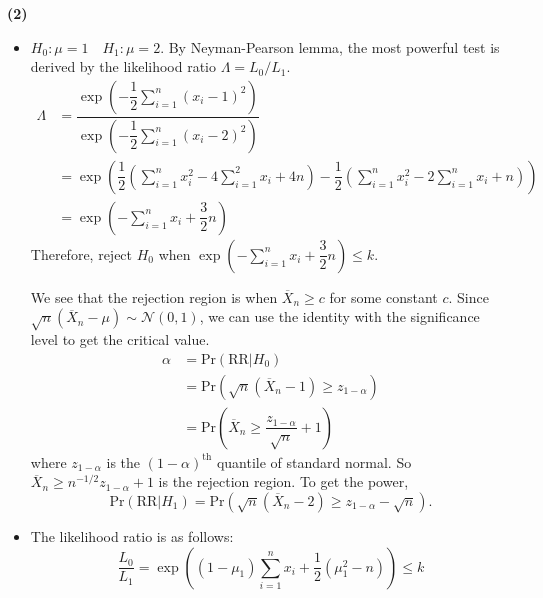 \documentclass[answers]{exam}
\begin{document}
\begin{questions}
      \begin{solution}
         \textbf{(2)}
         \begin{itemize}
            \item $H_{0}:\mu=1\quad H_{1}:\mu=2$. By Neyman-Pearson lemma, the most powerful test is derived by the likelihood ratio $\Lambda=L_{0}/L_{1}$.
            \begin{align}
              \Lambda &= \dfrac{\exp\left(-\dfrac{1}{2}\sum_{i=1}^{n}\left(x_{i}-1\right)^{2}\right)}{\exp\left(-\dfrac{1}{2}\sum_{i=1}^{n}\left(x_{i}-2\right)^{2}\right)}\\
              &= \exp\left(\dfrac{1}{2}\left(\sum_{i=1}^{n}x_{i}^{2}-4\sum_{i=1}^{2}x_{i}+4n\right)-\dfrac{1}{2}\left(\sum_{i=1}^{n}x_{i}^{2}-2\sum_{i=1}^{n}x_{i}+n\right) \right)\\
              &= \exp\left(-\sum_{i=1}^{n}x_{i}+\dfrac{3}{2}n\right)
            \end{align}
            Therefore, reject $H_{0}$ when $\exp\left(-\displaystyle\sum_{i=1}^{n}x_{i}+\dfrac{3}{2}n\right) \leq k$.\par
            We see that the rejection region is when $\overline{X}_{n}\geq c$ for some constant $c$. Since $\sqrt{n}\left(\overline{X}_{n}-\mu\right) \sim \mathcal{N}\left(0,1\right)$, we can use the identity with the significance level to get the critical value.
            \begin{align}
              \alpha &= \mathrm{Pr}\left(\mathrm{RR}|H_{0}\right) \\
              &= \mathrm{Pr}\left(\sqrt{n}\left(\overline{X}_{n}-1\right) \geq z_{1-\alpha}\right)\\
              &= \mathrm{Pr}\left(\overline{X}_{n} \geq \dfrac{z_{1-\alpha}}{\sqrt{n}}+1\right)
            \end{align}
            where $z_{1-\alpha}$ is the $(1-\alpha)^{\text{th}}$ quantile of standard normal. So $\overline{X}_{n}\geq n^{-1/2}z_{1-\alpha}+1$ is the rejection region. To get the power,
            \begin{equation}
              \mathrm{Pr}\left(\mathrm{RR}|H_{1}\right) = \mathrm{Pr}\left(\sqrt{n}\left(\overline{X}_{n}-2\right)\geq z_{1-\alpha}-\sqrt{n}\right).
            \end{equation}
            \item The likelihood ratio is as follows:
            \begin{equation}
              \dfrac{L_{0}}{L_{1}} = \exp\left(\left(1-\mu_{1}\right)\sum_{i=1}^{n}x_{i} + \dfrac{1}{2}\left(\mu_{1}^{2}-n\right) \right)\leq k

\end{equation}
\end{itemize}
\end{solution}
\end{questions}
\end{document}
